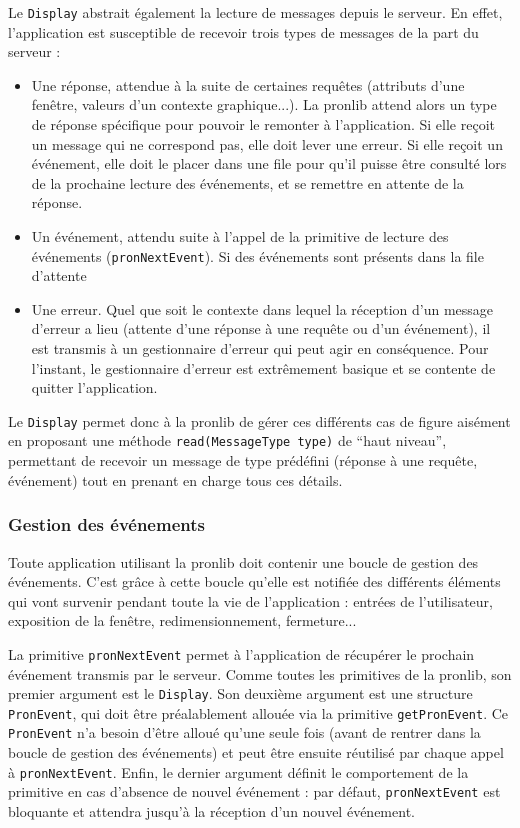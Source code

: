 Le \verb|Display| abstrait également la lecture de messages depuis le serveur. En effet, l'application est susceptible de recevoir trois types de messages de la part du serveur :
\begin{itemize}
  \item Une réponse, attendue à la suite de certaines requêtes (attributs d'une fenêtre, valeurs d'un contexte graphique...). La pronlib attend alors un type de réponse spécifique pour pouvoir le remonter à l'application. Si elle reçoit un message qui ne correspond pas, elle doit lever une erreur. Si elle reçoit un événement, elle doit le placer dans une file pour qu'il puisse être consulté lors de la prochaine lecture des événements, et se remettre en attente de la réponse.
  \item Un événement, attendu suite à l'appel de la primitive de lecture des événements (\verb|pronNextEvent|). Si des événements sont présents dans la file d'attente
  \item Une erreur. Quel que soit le contexte dans lequel la réception d'un message d'erreur a lieu (attente d'une réponse à une requête ou d'un événement), il est transmis à un gestionnaire d'erreur qui peut agir en conséquence. Pour l'instant, le gestionnaire d'erreur est extrêmement basique et se contente de quitter l'application.
\end{itemize}

\vspace{1em}

Le \verb|Display| permet donc à la pronlib de gérer ces différents cas de figure aisément en proposant une méthode \verb|read(MessageType type)| de ``haut niveau'', permettant de recevoir un message de type prédéfini (réponse à une requête, événement) tout en prenant en charge tous ces détails.

\subsubsection{Gestion des événements}

Toute application utilisant la pronlib doit contenir une boucle de gestion des événements. C'est grâce à cette boucle qu'elle est notifiée des différents éléments qui vont survenir pendant toute la vie de l'application : entrées de l'utilisateur, exposition de la fenêtre, redimensionnement, fermeture...

La primitive \verb|pronNextEvent| permet à l'application de récupérer le prochain événement transmis par le serveur. Comme toutes les primitives de la pronlib, son premier argument est le \verb|Display|. Son deuxième argument est une structure \verb|PronEvent|, qui doit être préalablement allouée via la primitive \verb|getPronEvent|. Ce \verb|PronEvent| n'a besoin d'être alloué qu'une seule fois (avant de rentrer dans la boucle de gestion des événements) et peut être ensuite réutilisé par chaque appel à \verb|pronNextEvent|. Enfin, le dernier argument définit le comportement de la primitive en cas d'absence de nouvel événement : par défaut, \verb|pronNextEvent| est bloquante et attendra jusqu'à la réception d'un nouvel événement.

